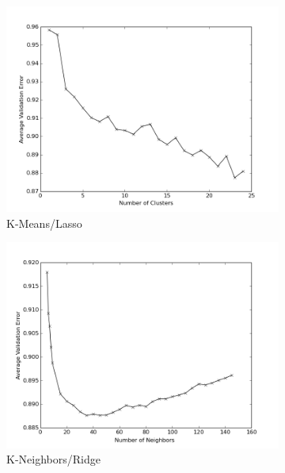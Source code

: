 \documentclass[11pt]{article}
\begin{document}
\begin{figure}[h!]
    \begin{subfigure}[h!]{0.33\textwidth}
        \includegraphics[width=\textwidth]{kmeans_lasso.png}
        \caption{K-Means/Lasso}
        \label{fig:kmBEST}
    \end{subfigure}%
    \begin{subfigure}[h!]{0.33\textwidth}
        \includegraphics[width=\textwidth]{KN_ridge.png}
        \caption{K-Neighbors/Ridge}
        \label{fig:knBEST}
    \end{subfigure}
    \begin{subfigure}[h!]{0.33\textwidth}

\end{subfigure}
\end{figure}
\end{document}
